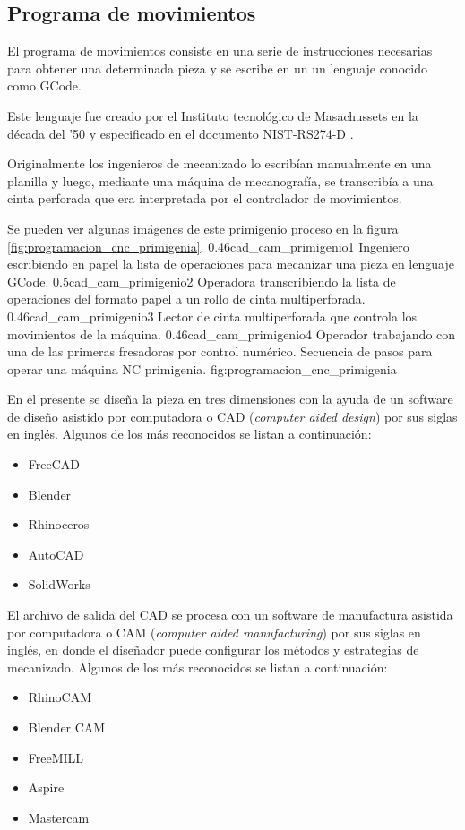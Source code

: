 \subsection{Programa de movimientos}
   El programa de movimientos consiste en una serie de instrucciones necesarias para obtener una determinada pieza y se escribe en un un lenguaje conocido como GCode\citep{WEBSITE:gcode_wiki}.\par
   Este lenguaje fue creado por el Instituto tecnológico de Masachussets en la década del '50 y especificado en el documento NIST-RS274-D \citep{rs274}.\par
Originalmente los ingenieros de mecanizado lo escribían manualmente en una planilla y luego, mediante una máquina de mecanografía, se transcribía a una cinta perforada que era interpretada por el controlador de movimientos.\par
Se pueden ver algunas imágenes de este primigenio proceso en la figura \ref{fig:programacion_cnc_primigenia}.
\subfigtwotwo
          {0.46}{cad_cam_primigenio1} {Ingeniero escribiendo en papel la lista de operaciones para mecanizar una pieza en lenguaje GCode.}
          {0.5}{cad_cam_primigenio2} {Operadora transcribiendo la lista de operaciones del formato papel a un rollo de cinta multiperforada.}
          {0.46}{cad_cam_primigenio3} {Lector de cinta multiperforada que controla los movimientos de la máquina.}
          {0.46}{cad_cam_primigenio4} {Operador trabajando con una de las primeras fresadoras por control numérico.}
          {Secuencia de pasos para operar una máquina NC primigenia.}
          {fig:programacion_cnc_primigenia}


          En el presente se diseña la pieza en tres dimensiones con la ayuda de un software de diseño asistido por computadora o CAD (\textit{computer aided design}) por sus siglas en inglés. Algunos de los más reconocidos se listan a continuación:
          \begin{itemize}
             \item{FreeCAD}
             \item{Blender}
             \item{Rhinoceros}
             \item{AutoCAD}
             \item{SolidWorks}
          \end{itemize}
   El archivo de salida del CAD se procesa con un software de manufactura asistida por computadora o CAM (\textit{computer aided manufacturing}) por sus siglas en inglés, en donde el diseñador puede configurar los métodos y estrategias de mecanizado. Algunos de los más reconocidos se listan a continuación:
          \begin{itemize}
             \item{RhinoCAM}
             \item{Blender CAM}
             \item{FreeMILL}
             \item{Aspire}
             \item{Mastercam}
          \end{itemize}

